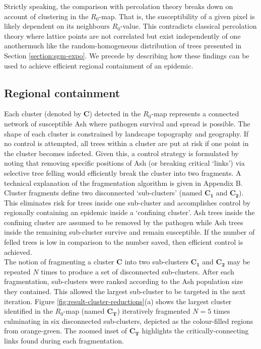 Strictly speaking, the comparison with percolation theory breaks down on account of clustering in the $R_0$-map. That is, the susceptibility of a given pixel is likely dependent on its neighbours $R_0$-value. This contradicts classical percolation theory where lattice points are not correlated but exist independently of one another\textemdash much like the random-homogeneous distribution of trees presented in Section \ref{section:sgm-expo}. We precede by describing how these findings can be used to achieve efficient regional containment of an epidemic.\\

\subsection{Regional containment}
\label{section:optimal-culling}

Each cluster (denoted by $\mathbf{C}$) detected in the $R_0$-map represents a connected network of susceptible Ash where pathogen survival and spread is possible. The shape of each cluster is constrained by landscape topography and geography. If no control is attempted, all trees within a cluster are put at risk if one point in the cluster becomes infected. Given this, a control strategy is formulated by noting that removing specific positions of Ash (or breaking critical `links') via selective tree felling would efficiently break the cluster into two fragments. A technical explanation of the fragmentation algorithm is given in Appendix B.\\

Cluster fragments define two disconnected `sub-clusters' (named $\mathbf{C_1}$ and $\mathbf{C_2}$). This eliminates risk for trees inside one sub-cluster and accomplishes control by regionally containing an epidemic inside a `confining cluster'. Ash trees inside the confining cluster are assumed to be removed by the pathogen while Ash trees inside the remaining sub-cluster survive and remain susceptible. If the number of felled trees is low in comparison to the number saved, then efficient control is achieved.\\

The notion of fragmenting a cluster $\mathbf{C}$ into two sub-clusters $\mathbf{C_1}$ and $\mathbf{C_2}$ may be repeated $N$ times to produce a set of disconnected sub-clusters. After each fragmentation, sub-clusters were ranked according to the Ash population size they contained. This allowed the largest sub-cluster to be targeted in the next iteration. Figure \ref{fig:result-cluster-reductions}(a) shows the largest cluster identified in the $R_0$-map (named $\mathbf{C_T}$) iteratively fragmented $N=5$ times culminating in six disconnected sub-clusters, depicted as the colour-filled regions from orange-green. The zoomed inset of $\mathbf{C_T}$ highlights the critically-connecting links found during each fragmentation.\\

